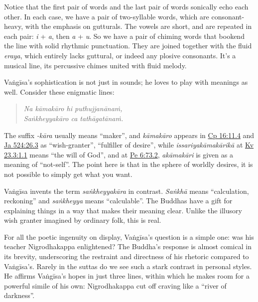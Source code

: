 \documentclass[12pt,openany]{book}%
\begin{document}
Notice that the first pair of words and the last pair of words sonically echo each other. In each case, we have a pair of two-syllable words, which are consonant-heavy, with the emphasis on gutturals. The vowels are short, and are repeated in each pair: \textit{i} + \textit{a}, then \textit{a} + \textit{u}. So we have a pair of chiming words that bookend the line with solid rhythmic punctuation. They are joined together with the fluid \textit{eraya}, which entirely lacks guttural, or indeed any plosive consonants. It’s a musical line, its percussive chimes united with fluid melody.

\textsanskrit{Vaṅgīsa}’s sophistication is not just in sounds; he loves to play with meanings as well. Consider these enigmatic lines:

\begin{verse}%
\textit{Na \textsanskrit{kāmakāro} hi \textsanskrit{puthujjanānaṁ},} \\
\textit{\textsanskrit{Saṅkheyyakāro} ca \textsanskrit{tathāgatānaṁ}.}

%
\end{verse}

The suffix \textit{-\textsanskrit{kāra}} usually means “maker”, and \textit{\textsanskrit{kāmakāro}} appears in \href{https://suttacentral.net/cp16}{Cp 16:11.4} and \href{https://suttacentral.net/ja524}{Ja 524:26.3} as “wish-granter”, “fulfiller of desire”, while \textit{\textsanskrit{issariyakāmakārikā}} at \href{https://suttacentral.net/kv23.3}{Kv 23.3:1.1} means “the will of God”, and at \href{https://suttacentral.net/pe6}{Pe 6:73.2}, \textit{\textsanskrit{akāmakāri}} is given as a meaning of “not-self”. The point here is that in the sphere of worldly desires, it is not possible to simply get what you want.

\textsanskrit{Vaṅgīsa} invents the term \textit{\textsanskrit{saṅkheyyakāra}} in contrast. \textit{\textsanskrit{Saṅkhā}} means “calculation, reckoning” and \textit{\textsanskrit{saṅkheyya}} means “calculable”. The Buddhas have a gift for explaining things in a way that makes their meaning clear. Unlike the illusory wish granter imagined by ordinary folk, this is real.

For all the poetic ingenuity on display, \textsanskrit{Vaṅgīsa}’s question is a simple one: was his teacher Nigrodhakappa enlightened? The Buddha’s response is almost comical in its brevity, underscoring the restraint and directness of his rhetoric compared to \textsanskrit{Vaṅgīsa}’s. Rarely in the suttas do we see such a stark contrast in personal styles. He affirms \textsanskrit{Vaṅgīsa}’s hopes in just three lines, within which he makes room for a powerful simile of his own: Nigrodhakappa cut off craving like a “river of darkness”.
\end{document}
